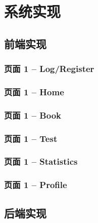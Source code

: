 \documentclass[twoside,11pt]{article}
\begin{document}
\section{系统实现}
\subsection{前端实现}
\subsubsection{页面 1 -- Log/Register}
\subsubsection{页面 1 -- Home}
\subsubsection{页面 1 -- Book}
\subsubsection{页面 1 -- Test}
\subsubsection{页面 1 -- Statistics}
\subsubsection{页面 1 -- Profile}

\newpage
\subsection{后端实现}
\end{document}
